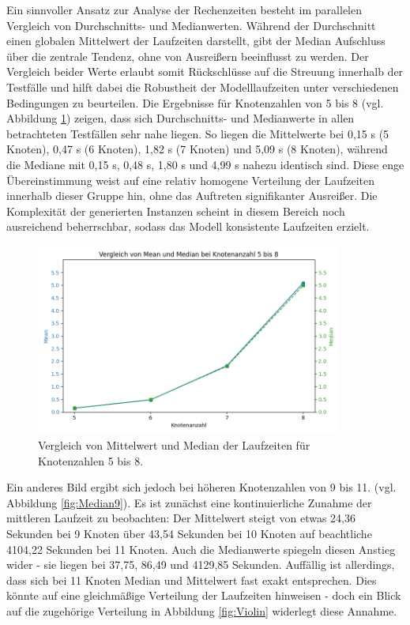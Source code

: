 \documentclass[bachelor, german]{algothesis}
\begin{document}
Ein sinnvoller Ansatz zur Analyse der Rechenzeiten besteht im parallelen Vergleich von Durchschnitts- und Medianwerten. Während der Durchschnitt einen globalen Mittelwert der Laufzeiten darstellt, gibt der Median Aufschluss über die zentrale Tendenz, ohne von Ausreißern beeinflusst zu werden. Der Vergleich beider Werte erlaubt somit Rückschlüsse auf die Streuung innerhalb der Testfälle und hilft dabei die Robustheit der Modelllaufzeiten unter verschiedenen Bedingungen zu beurteilen. \newline
Die Ergebnisse für Knotenzahlen von 5 bis 8 (vgl. Abbildung \ref{fig:Median5}) zeigen, dass sich Durchschnitts- und Medianwerte in allen betrachteten Testfällen sehr nahe liegen. So liegen die Mittelwerte bei 0,15 s (5 Knoten), 0,47 s (6 Knoten), 1,82 s (7 Knoten) und 5,09 s (8 Knoten), während die Mediane mit 0,15 s, 0,48 s, 1,80 s und 4,99 s nahezu identisch sind. Diese enge Übereinstimmung weist auf eine relativ homogene Verteilung der Laufzeiten innerhalb dieser Gruppe hin, ohne das Auftreten signifikanter Ausreißer. Die Komplexität der generierten Instanzen scheint in diesem Bereich noch ausreichend beherrschbar, sodass das Modell konsistente Laufzeiten erzielt.
\begin{figure}[H]
    \centering
    \includegraphics[width=0.9\textwidth]{figures/Mean_Medain5-8.png}
    \caption{Vergleich von Mittelwert und Median der Laufzeiten für Knotenzahlen 5 bis 8.}
    \label{fig:Median5}
\end{figure}
Ein anderes Bild ergibt sich jedoch bei höheren Knotenzahlen von 9 bis 11. (vgl. Abbildung \ref{fig:Median9}). \newline
Es ist zunächst eine kontinuierliche Zunahme der mittleren Laufzeit zu beobachten: Der Mittelwert steigt von etwas 24,36 Sekunden bei 9 Knoten über 43,54 Sekunden bei 10 Knoten auf beachtliche 4104,22 Sekunden bei 11 Knoten. Auch die Medianwerte spiegeln diesen Anstieg wider - sie liegen bei 37,75, 86,49 und 4129,85 Sekunden. Auffällig ist allerdings, dass sich bei 11 Knoten Median und Mittelwert fast exakt entsprechen. Dies könnte auf eine gleichmäßige Verteilung der Laufzeiten hinweisen - doch ein Blick auf die zugehörige Verteilung in Abbildung \ref{fig:Violin} widerlegt diese Annahme.\newline
\end{document}
